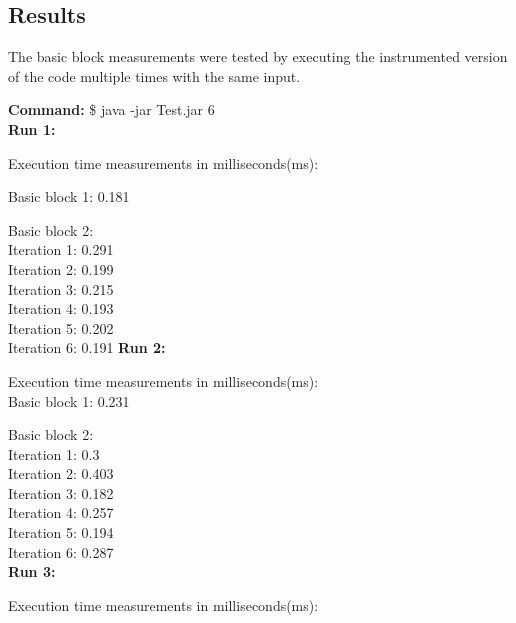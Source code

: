 \subsection{Results}
The basic block measurements were tested by executing the instrumented version of the code multiple times with the same input.\newline

\textbf{Command:} \$ java -jar Test.jar 6\\

\textbf{Run 1:}

Execution time measurements in milliseconds(ms):

Basic block 1: 0.181 

Basic block 2:\\

\hspace{2em} Iteration 1: 0.291 \\
\hspace{2em} Iteration 2: 0.199 \\
\hspace{2em} Iteration 3: 0.215\\
\hspace{2em} Iteration 4: 0.193\\
\hspace{2em} Iteration 5: 0.202\\
\hspace{2em} Iteration 6: 0.191
\textbf{Run 2:}

Execution time measurements in milliseconds(ms):\\

Basic block 1: 0.231

Basic block 2:\\
\hspace{2em} Iteration 1: 0.3\\
\hspace{2em} Iteration 2: 0.403\\
\hspace{2em} Iteration 3: 0.182\\
\hspace{2em} Iteration 4: 0.257\\
\hspace{2em} Iteration 5: 0.194\\
\hspace{2em} Iteration 6: 0.287\\

\textbf{Run 3:}

Execution time measurements in milliseconds(ms):\\

